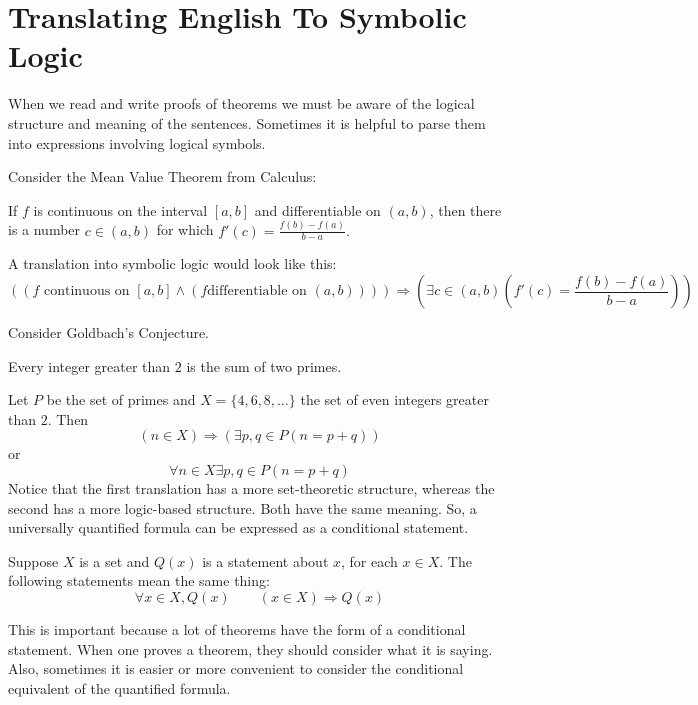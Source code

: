\section{Translating English To Symbolic Logic}
When we read and write proofs of theorems we must be aware of the logical structure and meaning of the sentences. Sometimes it is helpful to parse them into expressions involving logical symbols. 
\begin{example}
    Consider the Mean Value Theorem from Calculus:
    \begin{theorem}
        If $f$ is continuous on the interval $[a,b]$ and differentiable on $(a,b)$, then there is a number $c\in(a,b)$ for which $f'(c)=\frac{f(b)-f(a)}{b-a}.$
    \end{theorem}
    A translation into symbolic logic would look like this: 
    $$
    ((f \text{ continuous on } [a,b] \land (f \text{differentiable on } (a,b))))\Rightarrow(\exists c\in(a,b)(f'(c)=\frac{f(b)-f(a)}{b-a}))
    $$
\end{example}

\begin{example}
    Consider Goldbach's Conjecture. 
    \begin{theorem}
        Every integer greater than $2$ is the sum of two primes. 
    \end{theorem}
    Let $P$ be the set of primes and $X=\{ 4,6,8,\dots \}$ the set of even integers greater than $2$. Then 
    $$
    (n\in X)\Rightarrow(\exists p,q\in P(n=p+q))
    $$    
    or 
    $$
    \forall n\in X \exists p,q\in P (n=p+q)
    $$
    Notice that the first translation has a more set-theoretic structure, whereas the second has a more logic-based structure. Both have the same meaning. So, a universally quantified formula can be expressed as a conditional statement. 
\end{example}
\begin{fact}
    Suppose $X$ is a set and $Q(x)$ is a statement about $x$, for each $x\in X$. The following statements mean the same thing: 
    $$
    \forall x\in X,Q(x)\quad\quad (x\in X)\Rightarrow Q(x)
    $$
\end{fact}
This is important because a lot of theorems have the form of a conditional statement. When one proves a theorem, they should consider what it is saying. Also, sometimes it is easier or more convenient to consider the conditional equivalent of the quantified formula. 

